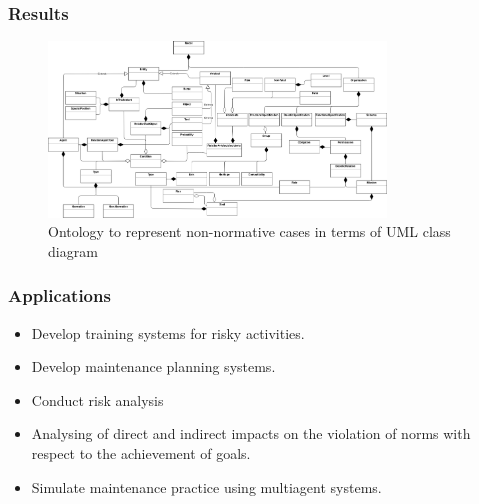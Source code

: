 \documentclass{beamer}
\begin{document}
\begin{frame}
	\frametitle{Results}
	
	\begin{figure}
  		\caption{Ontology to represent non-normative cases in terms of UML class diagram}
  		\centering
			  \includegraphics[width=0.8\textwidth]{uml_model_simulation}
	\end{figure}

\end{frame}
\begin{frame}
	\frametitle{Applications}
	\begin{itemize}
		\item Develop training systems for risky activities.
		\item Develop maintenance planning systems.
		\item Conduct risk analysis
		\item Analysing of direct and indirect impacts on the violation of norms with respect to the achievement of goals.
		\item Simulate maintenance practice using multiagent systems.
	\end{itemize}
\end{frame}





\end{document}
